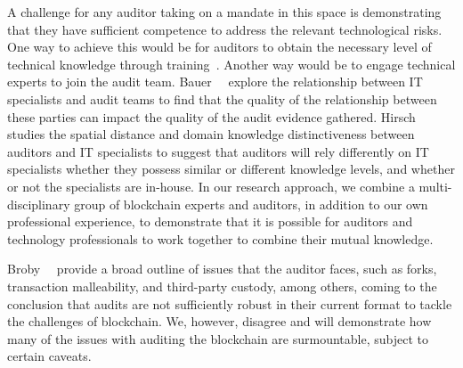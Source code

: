 A challenge for any auditor taking on a mandate in this space is demonstrating that they have sufficient competence to address the relevant technological risks. One way to achieve this would be for auditors to obtain the necessary level of technical knowledge through training~\cite{curtis2009auditors}. Another way would be to engage technical experts to join the audit team. Bauer~\etal~\cite{bauer2019one} explore the relationship between IT specialists and audit teams to find that the quality of the relationship between these parties can impact the quality of the audit evidence gathered. Hirsch~\cite{hirsch2020effect} studies the spatial distance and domain knowledge distinctiveness between auditors and IT specialists to suggest that auditors will rely differently on IT specialists whether they possess similar or different knowledge levels, and whether or not the specialists are in-house. In our research approach, we combine a multi-disciplinary group of blockchain experts and auditors, in addition to our own professional experience, to demonstrate that it is possible for auditors and technology professionals to work together to combine their mutual knowledge.

Broby~\etal~\cite{broby2017financial} provide a broad outline of issues that the auditor faces, such as forks, transaction malleability, and third-party custody, among others, coming to the conclusion that audits are not sufficiently robust in their current format to tackle the challenges of blockchain. We, however, disagree and will demonstrate how many of the issues with auditing the blockchain are surmountable, subject to certain caveats.


